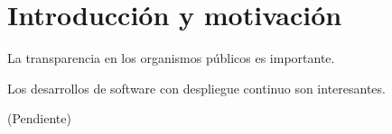 \chapter{Introducción y motivación}

La transparencia en los organismos públicos es importante.

Los desarrollos de software con despliegue continuo son interesantes.

(Pendiente)